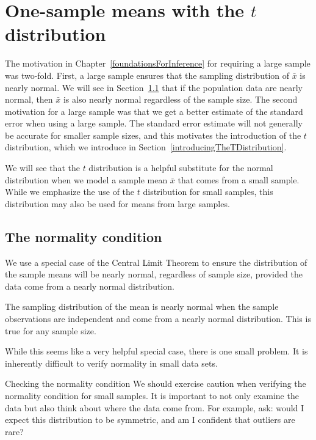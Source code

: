 \section{One-sample means with the $t$ distribution}
\label{oneSampleMeansWithTDistribution}

The motivation in Chapter~\ref{foundationsForInference} for requiring a large sample was two-fold. First, a large sample ensures that the sampling distribution of $\bar{x}$ is nearly normal. We will see in Section~\ref{normalityCond} that if the population data are nearly normal, then $\bar{x}$ is also nearly normal regardless of the sample size. The second motivation for a large sample was that we get a better estimate of the standard error when using a large sample. The standard error estimate will not generally be accurate for smaller sample sizes, and this motivates the introduction of the $t$ distribution, which we introduce in Section~\ref{introducingTheTDistribution}.

We will see that the $t$ distribution is a helpful substitute for the normal distribution when we model a sample mean $\bar{x}$ that comes from a small sample. While we emphasize the use of the $t$ distribution for small samples, this distribution may also be used for means from large samples.

\subsection{The normality condition}
\label{normalityCond}

We use a special case of the Central Limit Theorem to ensure the distribution of the sample means will be nearly normal, regardless of sample size, provided the data come from a nearly normal distribution.

\begin{termBox}{
The sampling distribution of the mean is nearly normal when the sample observations are independent and come from a nearly normal distribution. This is true for any sample size.
}
\end{termBox}

While this seems like a very helpful special case, there is one small problem. It is inherently difficult to verify normality in small data sets.

\begin{caution}
{Checking the normality condition}
{We should exercise caution when verifying the normality condition for small samples. It is important to not only examine the data but also think about where the data come from. For example, ask: would I expect this distribution to be symmetric, and am I confident that outliers are rare?}
\end{caution}

